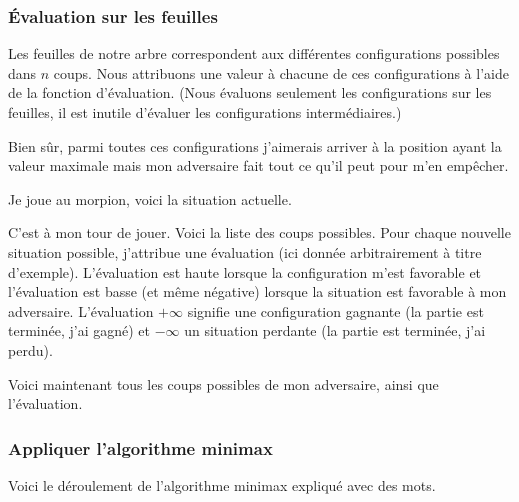 \documentclass[11pt,class=report,crop=false]{standalone}
\begin{document}

\subsubsection{Évaluation sur les feuilles}

Les feuilles de notre arbre correspondent aux différentes configurations possibles dans $n$ coups. Nous attribuons une valeur à chacune de ces configurations à l'aide de la fonction d'évaluation. (Nous évaluons seulement les configurations sur les feuilles, il est inutile d'évaluer les configurations intermédiaires.)


Bien sûr, parmi toutes ces configurations j'aimerais arriver à la position ayant la valeur maximale mais mon adversaire fait tout ce qu'il peut pour m'en empêcher.



\begin{exemple}
Je joue au morpion, voici la situation actuelle.
\begin{center}
\end{center}

C'est à mon tour de jouer. Voici la liste des coups possibles. Pour chaque nouvelle situation possible, j'attribue une évaluation (ici donnée arbitrairement à titre d'exemple). L'évaluation est haute lorsque la configuration m'est favorable et l'évaluation est basse (et même négative) lorsque la situation est favorable à mon adversaire. 
L'évaluation $+\infty$ signifie une configuration gagnante (la partie est terminée, j'ai gagné) et $-\infty$ un situation perdante (la partie est terminée, j'ai perdu).





Voici maintenant tous les coups possibles de mon adversaire, ainsi que l'évaluation.



\end{exemple}	





\subsubsection{Appliquer l'algorithme minimax}

Voici le déroulement de l'algorithme minimax expliqué avec des mots.
\end{document}
